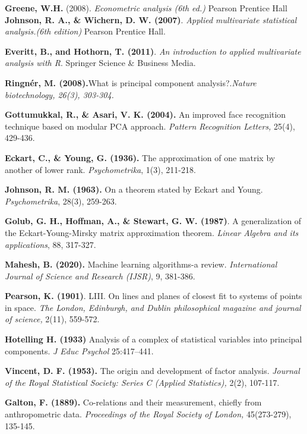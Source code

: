 \begin{thebibliography}{99}
\textbf{Greene,  W.H.} (2008). \emph{Econometric analysis (6th ed.)} Pearson Prentice Hall
\textbf{Johnson, R. A., \& Wichern, D. W. (2007)}. \emph{Applied multivariate statistical analysis.(6th edition)} Pearson Prentice Hall.

\textbf{Everitt, B., and Hothorn, T. (2011)}. \emph{An introduction to applied multivariate analysis with R}. Springer Science \& Business Media.

\textbf{Ringnér, M. (2008).}What is principal component analysis?.\emph{Nature biotechnology, 26(3), 303-304.}

 \textbf{Gottumukkal, R., \& Asari, V. K. (2004).} An improved face recognition technique based on modular PCA approach.\emph{ Pattern Recognition Letters,} 25(4), 429-436.

\textbf{Eckart, C., \& Young, G. (1936).} The approximation of one matrix by another of lower rank. \emph{Psychometrika}, 1(3), 211-218.

 \textbf{Johnson, R. M. (1963).} On a theorem stated by Eckart and Young. \emph{Psychometrika}, 28(3), 259-263.

\textbf{Golub, G. H., Hoffman, A., \& Stewart, G. W. (1987)}. A generalization of the Eckart-Young-Mirsky matrix approximation theorem. \emph{Linear Algebra and its applications}, 88, 317-327.

\textbf{Mahesh, B. (2020).} Machine learning algorithms-a review. \emph{International Journal of Science and Research (IJSR)}, 9, 381-386.

 \textbf{Pearson, K. (1901)}. LIII. On lines and planes of closest fit to systems of points in space. \emph{The London, Edinburgh, and Dublin philosophical magazine and journal of science,} 2(11), 559-572.

\textbf{Hotelling H. (1933)} Analysis of a complex of statistical variables
into principal components. \emph{J Educ Psychol }
25:417–441.

\textbf{Vincent, D. F. (1953).} The origin and development of factor analysis. \emph{Journal of the Royal Statistical Society: Series C (Applied Statistics),} 2(2), 107-117.

 \textbf{Galton, F. (1889).} Co-relations and their measurement, chiefly from anthropometric data.\emph{ Proceedings of the Royal Society of London,} 45(273-279), 135-145.


\end{thebibliography}
